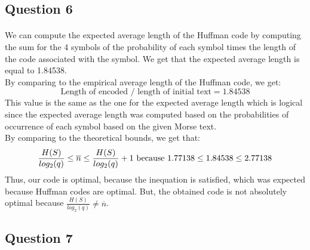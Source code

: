 \documentclass[a4paper, 11pt, oneside]{article}
\begin{document}
\subsection{Question 6}
\paragraph{}We can compute the expected average length of the Huffman code by computing the sum for the 4 symbols of the probability of each symbol times the length of the code associated with the symbol.
We get that the expected average length is equal to 1.84538.\\
By comparing to the empirical average length of the Huffman code, we get:
$$\text{Length of encoded } / \text{ length of initial text} = 1.84538$$
This value is the same as the one for the expected average length which is logical since the expected average length was computed based on the probabilities of occurrence of each symbol based on the given Morse text.\\
By comparing to the theoretical bounds, we get that:\\
\begin{equation}
    \frac{H(S)}{log_2(q)} \leq \overline{n} \leq \frac{H(S)}{log_2(q)} + 1$ because $1.77138 \leq 1.84538 \leq 2.77138
\end{equation}
Thus, our code is optimal, because the inequation is satisfied, which was expected because Huffman codes are optimal. But, the obtained code is not absolutely optimal because $\frac{H(S)}{log_2(q)} \neq \overline{n}$.

\subsection{Question 7}
\end{document}
